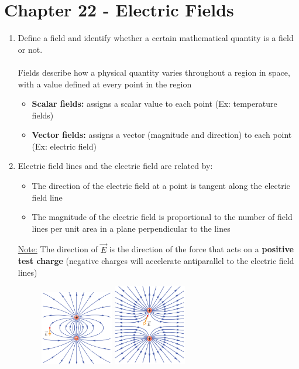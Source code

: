 \documentclass[12pt]{article}
\begin{document}
\section*{Chapter 22 - Electric Fields}
\begin{enumerate}
    \item Define a field and identify whether a certain mathematical quantity is a field or not.\\\\
    Fields describe how a physical quantity varies throughout a region in space, with a value defined at every point in the region
    \begin{itemize}
        \item \textbf{Scalar fields:} assigns a scalar value to each point (Ex: temperature fields)
        \item \textbf{Vector fields:} assigns a vector (magnitude and direction) to each point (Ex: electric field)
    \end{itemize}    
    \item Electric field lines and the electric field are related by:
    \begin{itemize}
        \item The direction of the electric field at a point is tangent along the electric field line
        \item The magnitude of the electric field is proportional to the number of field lines per unit area in a plane perpendicular to the lines
    \end{itemize}
    \underline{Note:} The direction of $\vec{E}$ is the direction of the force that acts on a \textbf{positive test charge} (negative charges will accelerate antiparallel to the electric field lines)
\begin{figure}[H]
    \centering
    \includegraphics[width=0.3\textwidth]{e field dipole.png}
    \hspace{0.05\textwidth}
    \includegraphics[width=0.3\textwidth]{e field same charge.png}

\end{figure}
\end{enumerate}
\end{document}
